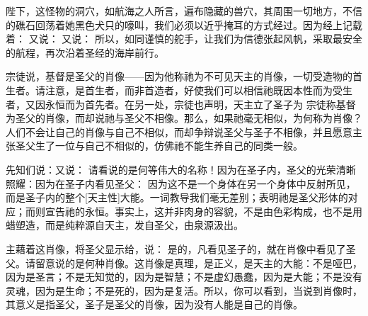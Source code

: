 陛下，这怪物的洞穴，如航海之人所言，遍布隐藏的兽穴，其周围一切地方，不信的礁石回荡着她黑色犬只的嚎叫，我们必须以近乎掩耳的方式经过。因为经上记载着： 又说： 又说： 所以，如同谨慎的舵手，让我们为信德张起风帆，采取最安全的航程，再次沿着圣经的海岸前行。\par

\par

宗徒说，基督是圣父的肖像——因为他称祂为不可见天主的肖像，一切受造物的首生者。请注意，是首生者，而非首造者，好使我们可以相信祂既因本性而为受生者，又因永恒而为首先者。在另一处，宗徒也声明，天主立了圣子为 宗徒称基督为圣父的肖像，而却说祂与圣父不相像。那么，如果祂毫无相似，为何称为肖像？人们不会让自己的肖像与自己不相似，而却争辩说圣父与圣子不相像，并且愿意主张圣父生了一位与自己不相似的，仿佛祂不能生养自己的同类一般。\par

先知们说：又说： 请看说的是何等伟大的名称！因为在圣子内，圣父的光荣清晰照耀：因为在圣子内看见圣父： 因为这不是一个身体在另一个身体中反射所见，而是圣子内的整个[天主性]大能。一词教导我们毫无差别；表明祂是圣父形体的对应；而则宣告祂的永恒。事实上，这并非肉身的容貌，不是由色彩构成，也不是用蜡塑造，而是纯粹源自天主，发自圣父，由泉源汲出。\par

主藉着这肖像，将圣父显示给，说： 是的，凡看见圣子的，就在肖像中看见了圣父。请留意说的是何种肖像。这肖像是真理，是正义，是天主的大能：不是哑巴，因为是圣言；不是无知觉的，因为是智慧；不是虚幻愚蠢，因为是大能；不是没有灵魂，因为是生命；不是死的，因为是复活。所以，你可以看到，当说到肖像时，其意义是指圣父，圣子是圣父的肖像，因为没有人能是自己的肖像。\par

